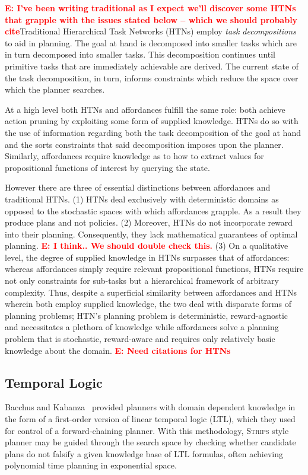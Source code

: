 \documentclass[conference]{IEEEtran}
\newcommand{\enote}[1]{\textcolor{Red}{\textbf{E: #1}}}
\begin{document}
\enote{I've been writing traditional as I expect we'll discover some HTNs that grapple with the issues stated below -- which we should probably cite}Traditional Hierarchical Task Networks (HTNs) employ \textit{task decompositions} to aid in planning. The goal at hand is decomposed into smaller tasks which are in turn decomposed into smaller tasks. This decomposition continues until primitive tasks that are immediately achievable are derived. The current state of the task decomposition, in turn, informs constraints which reduce the space over which the planner searches.

At a high level both HTNs and affordances fulfill the same role: both achieve action pruning by exploiting some form of supplied knowledge. HTNs do so with the use of information regarding both the task decomposition of the goal at hand and the sorts constraints that said decomposition imposes upon the planner. Similarly, affordances require knowledge as to how to extract values for propositional functions of interest by querying the state.

However there are three of essential distinctions between affordances and traditional HTNs. (1) HTNs deal exclusively with deterministic domains as opposed to the stochastic spaces with which affordances grapple. As a result they produce plans and not policies. (2) Moreover, HTNs do not incorporate reward into their planning. Consequently, they lack mathematical guarantees of optimal planning. \enote{I think.. We should double check this.} (3) On a qualitative level, the degree of supplied knowledge in HTNs surpasses that of affordances: whereas affordances simply require relevant propositional functions, HTNs require not only constraints for sub-tasks but a hierarchical framework of arbitrary complexity. Thus, despite a superficial similarity between affordances and HTNs wherein both employ supplied knowledge, the two deal with disparate forms of planning problems; HTN's planning problem is deterministic, reward-agnostic and necessitates a plethora of knowledge while affordances solve a planning problem that is stochastic, reward-aware and requires only relatively basic knowledge about the domain.
\enote{Need citations for HTNs}


\subsection{Temporal Logic}

Bacchus and Kabanza~\cite{Bacchus95usingtemporal,Bacchus99usingtemporal} provided
planners with domain dependent knowledge in the form of a first-order version of linear
temporal logic (LTL), which they used for control of a forward-chaining planner. With this methodology, 
\textsc{Strips} style planner may be guided through the search space by checking 
whether candidate plans do not falsify a given knowledge base of LTL formulas, often
achieving polynomial time planning in exponential space.
\end{document}
